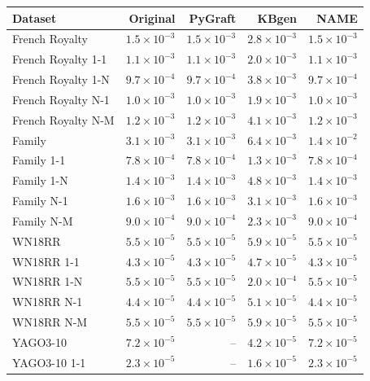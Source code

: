 \begin{tabular}{lrrrr}
\toprule
Dataset & Original & PyGraft & KBgen & NAME \\
\midrule
French Royalty & $1.5\times10^{-3}$ & $1.5\times10^{-3}$ & $2.8\times10^{-3}$ & $1.5\times10^{-3}$ \\
French Royalty 1-1 & $1.1\times10^{-3}$ & $1.1\times10^{-3}$ & $2.0\times10^{-3}$ & $1.1\times10^{-3}$ \\
French Royalty 1-N & $9.7\times10^{-4}$ & $9.7\times10^{-4}$ & $3.8\times10^{-3}$ & $9.7\times10^{-4}$ \\
French Royalty N-1 & $1.0\times10^{-3}$ & $1.0\times10^{-3}$ & $1.9\times10^{-3}$ & $1.0\times10^{-3}$ \\
French Royalty N-M & $1.2\times10^{-3}$ & $1.2\times10^{-3}$ & $4.1\times10^{-3}$ & $1.2\times10^{-3}$ \\
\midrule
Family & $3.1\times10^{-3}$ & $3.1\times10^{-3}$ & $6.4\times10^{-3}$ & $1.4\times10^{-2}$ \\
Family 1-1 & $7.8\times10^{-4}$ & $7.8\times10^{-4}$ & $1.3\times10^{-3}$ & $7.8\times10^{-4}$ \\
Family 1-N & $1.4\times10^{-3}$ & $1.4\times10^{-3}$ & $4.8\times10^{-3}$ & $1.4\times10^{-3}$ \\
Family N-1 & $1.6\times10^{-3}$ & $1.6\times10^{-3}$ & $3.1\times10^{-3}$ & $1.6\times10^{-3}$ \\
Family N-M & $9.0\times10^{-4}$ & $9.0\times10^{-4}$ & $2.3\times10^{-3}$ & $9.0\times10^{-4}$ \\
\midrule
WN18RR & $5.5\times10^{-5}$ & $5.5\times10^{-5}$ & $5.9\times10^{-5}$ & $5.5\times10^{-5}$ \\
WN18RR 1-1 & $4.3\times10^{-5}$ & $4.3\times10^{-5}$ & $4.7\times10^{-5}$ & $4.3\times10^{-5}$ \\
WN18RR 1-N & $5.5\times10^{-5}$ & $5.5\times10^{-5}$ & $2.0\times10^{-4}$ & $5.5\times10^{-5}$ \\
WN18RR N-1 & $4.4\times10^{-5}$ & $4.4\times10^{-5}$ & $5.1\times10^{-5}$ & $4.4\times10^{-5}$ \\
WN18RR N-M & $5.5\times10^{-5}$ & $5.5\times10^{-5}$ & $5.9\times10^{-5}$ & $5.5\times10^{-5}$ \\
\midrule
YAGO3-10 & $7.2\times10^{-5}$ & – & $4.2\times10^{-5}$ & $7.2\times10^{-5}$ \\
YAGO3-10 1-1 & $2.3\times10^{-5}$ & – & $1.6\times10^{-5}$ & $2.3\times10^{-5}$ \\

\end{tabular}
